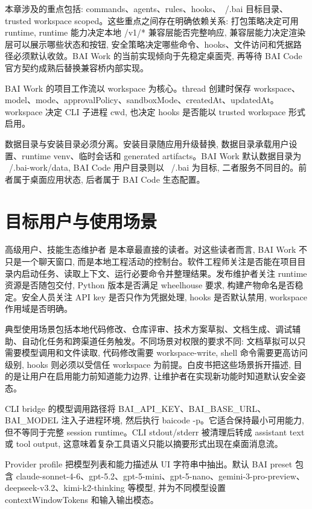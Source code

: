 本章涉及的重点包括: commands、agents、rules、hooks、~/.bai 目标目录、trusted workspace scoped。这些重点之间存在明确依赖关系: 打包策略决定可用 runtime, runtime 能力决定本地 /v1/* 兼容层能否完整响应, 兼容层能力决定渲染层可以展示哪些状态和按钮, 安全策略决定哪些命令、hooks、文件访问和凭据路径必须默认收敛。BAI Work 的当前实现倾向于先稳定桌面壳, 再等待 BAI Code 官方契约成熟后替换兼容桥内部实现。

BAI Work 的项目工作流以 workspace 为核心。thread 创建时保存 workspace、model、mode、approvalPolicy、sandboxMode、createdAt、updatedAt。workspace 决定 CLI 子进程 cwd, 也决定 hooks 是否能以 trusted workspace 形式启用。

数据目录与安装目录必须分离。安装目录随应用升级替换, 数据目录承载用户设置、runtime venv、临时会话和 generated artifacts。BAI Work 默认数据目录为 ~/.bai-work/data, BAI Code 用户目录则以 ~/.bai 为目标, 二者服务不同目的。前者属于桌面应用状态, 后者属于 BAI Code 生态配置。

\section{目标用户与使用场景}
高级用户、技能生态维护者 是本章最直接的读者。对这些读者而言, BAI Work 不只是一个聊天窗口, 而是本地工程活动的控制台。软件工程师关注是否能在项目目录内启动任务、读取上下文、运行必要命令并整理结果。发布维护者关注 runtime 资源是否随包交付, Python 版本是否满足 wheelhouse 要求, 构建产物命名是否稳定。安全人员关注 API key 是否只作为凭据处理, hooks 是否默认禁用, workspace 作用域是否明确。

典型使用场景包括本地代码修改、仓库评审、技术方案草拟、文档生成、调试辅助、自动化任务和跨渠道任务触发。不同场景对权限的要求不同: 文档草拟可以只需要模型调用和文件读取, 代码修改需要 workspace-write, shell 命令需要更高访问级别, hooks 则必须以受信任 workspace 为前提。白皮书把这些场景拆开描述, 目的是让用户在启用能力前知道能力边界, 让维护者在实现新功能时知道默认安全姿态。

CLI bridge 的模型调用路径将 BAI\_API\_KEY、BAI\_BASE\_URL、BAI\_MODEL 注入子进程环境, 然后执行 baicode -p。它适合保持最小可用能力, 但不等同于完整 session runtime。CLI stdout/stderr 被清理后转成 assistant text 或 tool output, 这意味着复杂工具语义只能以摘要形式出现在桌面消息流。

Provider profile 把模型列表和能力描述从 UI 字符串中抽出。默认 BAI preset 包含 claude-sonnet-4-6、gpt-5.2、gpt-5-mini、gpt-5-nano、gemini-3-pro-preview、deepseek-v3.2、kimi-k2-thinking 等模型, 并为不同模型设置 contextWindowTokens 和输入输出模态。

